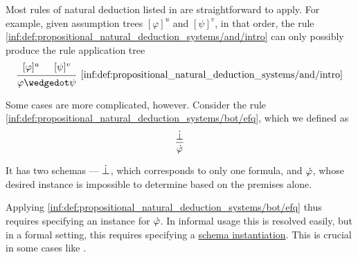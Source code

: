 \begin{remark}\label{rem:natural_deduction_rule_application}
  Most rules of natural deduction listed in  are straightforward to apply. For example, given assumption trees \( [\varphi]^u \) and \( [\psi]^v \), in that order, the rule \ref{inf:def:propositional_natural_deduction_systems/and/intro} can only possibly produce the rule application tree
  \begin{equation*}
    \begin{prooftree}
      \hypo{ [\varphi]^u }
      \hypo{ [\psi]^v }
      \infer2[\ref{inf:def:propositional_natural_deduction_systems/and/intro}]{ \varphi \synwedge \psi }
    \end{prooftree}
  \end{equation*}

  Some cases are more complicated, however. Consider the rule \ref{inf:def:propositional_natural_deduction_systems/bot/efq}, which we defined as
  \begin{equation*}
    \begin{prooftree}
      \hypo{ \synbot }
      \infer1{ \syn\varphi }
    \end{prooftree}
  \end{equation*}

  It has two schemas --- \( \dot{\bot} \), which corresponds to only one formula, and \( \dot{\varphi} \), whose desired instance is impossible to determine based on the premises alone.

  Applying \ref{inf:def:propositional_natural_deduction_systems/bot/efq} thus requires specifying an instance for \( \dot{\varphi} \). In informal usage this is resolved easily, but in a formal setting, this requires specifying a \hyperref[def:propositional_schema_instantiation]{schema instantiation}. This is crucial in some cases like .
\end{remark}

